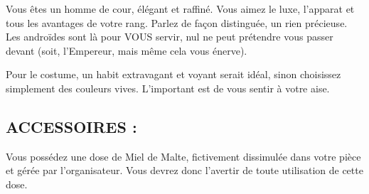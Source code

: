 \documentclass[14pt,twocolumn]{extarticle}
\begin{document}
Vous êtes un homme de cour, élégant et raffiné. Vous aimez le luxe, l’apparat
et tous les avantages de votre rang. Parlez de façon distinguée, un rien
précieuse. Les androïdes sont là pour VOUS servir, nul ne peut prétendre vous
passer devant (soit, l’Empereur, mais même cela vous énerve).

Pour le costume, un habit extravagant et voyant serait idéal, sinon choisissez
simplement des couleurs vives. L’important est de vous sentir à votre aise.

\subsection{ACCESSOIRES :}

Vous possédez une dose de Miel de Malte, fictivement dissimulée dans votre
pièce et gérée par l'organisateur. Vous devrez donc l'avertir de toute
utilisation de cette dose.
\end{document}
